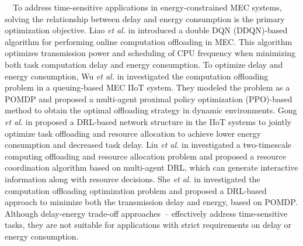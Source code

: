 \documentclass[12pt,draftclsnofoot,onecolumn]{IEEEtran}
\newenvironment{my}[2]%
{\begin{list}{}%
{\setlength{\rightmargin}{#1}\setlength{\leftmargin}{#2}}%


 \item[]{}

} {\end{list}}
\begin{document}
\begin{enumerate}
\begin{my}{1cm}{1cm}
{		

		\,\,\,\,
		To address time-sensitive applications in energy-constrained MEC systems, solving the relationship between delay and energy consumption is the primary optimization objective.
		Liao \textit{et al.} in \cite{liao2023online} introduced a double DQN (DDQN)-based algorithm for performing online computation offloading in MEC. This algorithm optimizes transmission power and scheduling of CPU frequency when minimizing both task computation delay and energy consumption. 
		To optimize delay and energy consumption, Wu \textit{et al.} in \cite{wu2023multi} investigated the computation offloading problem in a queuing-based MEC IIoT system. They modeled the problem as a POMDP and proposed a multi-agent proximal policy optimization (PPO)-based method to obtain the optimal offloading strategy in dynamic environments. 
		Gong \textit{et al.} in \cite{gong2022edge} proposed a DRL-based network structure in the IIoT systems to jointly optimize task offloading and resource allocation to achieve lower energy consumption and decreased task delay.
		Liu \textit{et al.} in \cite{liu2021learn} investigated a two-timescale computing offloading and resource allocation problem and proposed a resource coordination algorithm based on multi-agent DRL, which can generate interactive information along with resource decisions. 
		She \textit{et al.} in \cite{she2024efficient} investigated the computation offloading optimization problem and proposed a DRL-based approach to minimize both the transmission delay and energy, based on POMDP.
		Although delay-energy trade-off approaches~\cite{liao2023online}--\cite{she2024efficient} effectively address time-sensitive tasks, they are not suitable for applications with strict requirements on delay or energy consumption. \vspace{2mm}
		
}
\end{my}
\end{enumerate}
\end{document}
